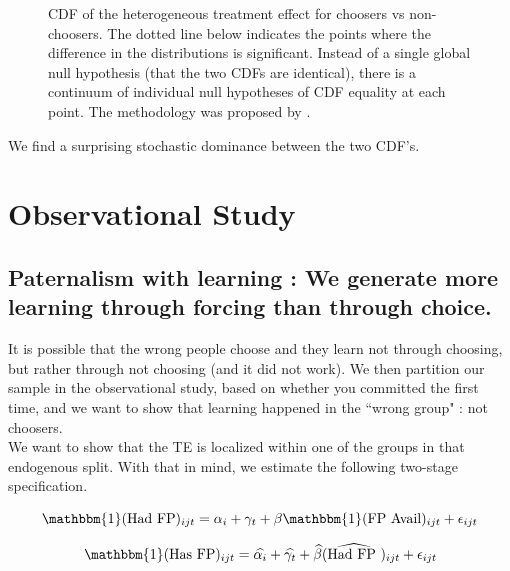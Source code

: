\documentclass[oneside,11pt]{article}
\begin{document}
\begin{figure}[H]
\begin{center}
    \end{center}
     \scriptsize    CDF of the heterogeneous treatment effect for choosers vs non-choosers. The dotted line below indicates the points where the difference in the distributions is significant.  Instead of a single global null hypothesis (that the two CDFs are identical), there is a continuum of individual null hypotheses of CDF equality at each point. The methodology was proposed by \cite{GOLDMAN2018143}.

 

\end{figure}

We find a surprising  stochastic dominance between the two CDF's.


\newpage

\section{Observational Study}

\subsection*{Paternalism  with learning : We generate more learning through forcing than through choice.}

It is possible that the wrong people choose and they learn not through choosing, but rather through not choosing (and it did not work). We then partition our sample in the observational study, based on whether you committed the first time, and we want to show that learning happened in the ``wrong group" : not choosers.\\



We want to show that the TE is localized within one of the groups in that endogenous split. With that in mind, we estimate the following two-stage specification.


\begin{equation}
    \mathbbm{1}(\text{Had FP})_{ijt} = \alpha_i + \gamma_t + \beta \mathbbm{1}(\text{FP Avail})_{ijt}  + \epsilon_{ijt}
    \label{eqn:fs}
\end{equation}


\begin{equation}
    \mathbbm{1}(\text{Has FP})_{ijt} = \widehat{\alpha_i }+ \widehat{\gamma_t} + \widehat{\beta }(\widehat{\text{Had FP }})_{ijt}  + \epsilon_{ijt}
    \label{eqn:2s}
\end{equation}
\end{document}
